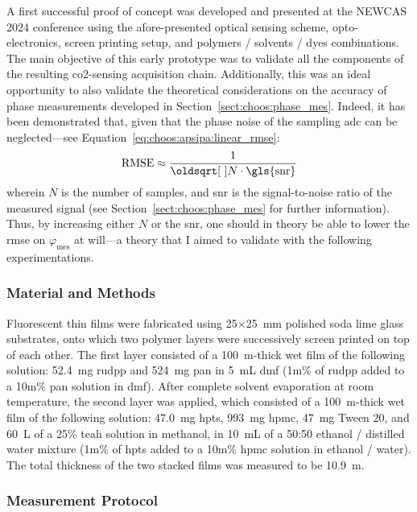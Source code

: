 A first successful proof of concept was developed and presented at the NEWCAS 2024 conference\cite{dervieux2024newcas} using the afore-presented optical sensing scheme, opto-electronics, screen printing setup, and polymers / solvents / dyes combinations. The main objective of this early prototype was to validate all the components of the resulting \gls{co2}-sensing acquisition chain. Additionally, this was an ideal opportunity to also validate the theoretical considerations on the accuracy of phase measurements developed in Section~\ref{sect:choos:phase_mes}. Indeed, it has been demonstrated that, given that the phase noise of the sampling \gls{adc} can be neglected---see Equation~\ref{eq:choos:apsipa:linear_rmse}:
\begin{equation}\label{eq:thin_film:rmse_phase_noise_gene}
	\text{RMSE} \approx \frac{1}{\sqrt{N \cdot \text{\gls{snr}}}}
\end{equation}
wherein $N$ is the number of samples, and \gls{snr} is the signal-to-noise ratio of the measured signal (see Section~\ref{sect:choos:phase_mes} for further information). Thus, by increasing either $N$ or the \gls{snr}, one should in theory be able to lower the \gls{rmse} on $\varphi_\text{mes}$ at will---a theory that I aimed to validate with the following experimentations.

\subsubsection{Material and Methods}\label{subsect:thin_film:experimental:newcas_mm}

Fluorescent thin films were fabricated using 25$\times$25~mm polished soda lime glass substrates, onto which two polymer layers were successively screen printed on top of each other. The first layer consisted of a 100~\textmu{}m-thick wet film of the following solution: 52.4~mg \gls{rudpp} and 524~mg \gls{pan} in 5~mL \gls{dmf} (1m\% of \gls{rudpp} added to a 10m\% \gls{pan} solution in \gls{dmf}). After complete solvent evaporation at room temperature, the second layer was applied, which consisted of a 100~\textmu{}m-thick wet film of the following solution: 47.0~mg \gls{hpts}, 993~mg \gls{hpmc}, 47~mg Tween 20, and 60~\textmu{}L of a 25\% \gls{teah} solution in methanol, in 10~mL of a 50:50 ethanol / distilled water mixture (1m\% of \gls{hpts} added to a 10m\% \gls{hpmc} solution in ethanol / water). The total thickness of the two stacked films was measured to be 10.9~\textmu{}m.

\subsubsection{Measurement Protocol}

